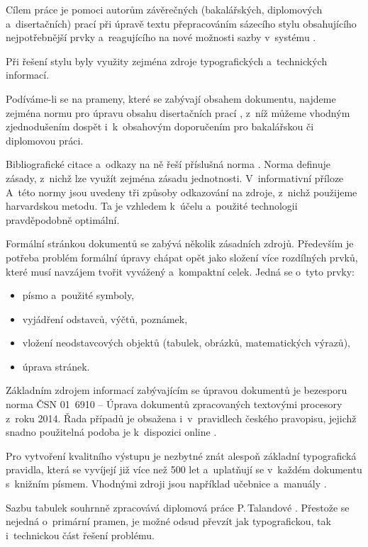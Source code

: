 \documentclass[twoside,12pt]{article}
\begin{document}
Cílem práce je pomoci autorům závěrečných (bakalářských, diplomových
a~disertačních) prací při úpravě textu přepracováním sázecího stylu obsahujícího
nejpotřebnější prvky a~reagujícího na nové možnosti sazby v~systému \XeLaTeX.

Při řešení stylu byly využity zejména zdroje typografických a~technických
informací.

Podíváme-li se na prameny, které se zabývají obsahem dokumentu, najdeme
zejména normu pro úpravu obsahu disertačních prací \cite{csn7144}, z~níž
můžeme vhodným zjednodušením dospět i~k~obsahovým doporučením pro bakalářskou
či diplomovou práci.

Bibliografické citace a~odkazy na ně řeší příslušná norma \cite{csniso690}.
Norma definuje zásady, z~nichž lze využít zejména zásadu jednotnosti. V~informativní
příloze A~této normy jsou uvedeny tři způsoby odkazování na zdroje, z~nichž
použijeme harvardskou metodu. Ta je vzhledem k~účelu a~použité technologii
pravděpodobně optimální.

Formální stránkou dokumentů se zabývá několik zásadních zdrojů. Především je potřeba
problém formální úpravy chápat opět jako složení více rozdílných prvků, které
musí navzájem tvořit vyvážený a~kompaktní celek. Jedná se o~tyto prvky:
\begin{itemize}
    \item písmo a~použité symboly,
    \item vyjádření odstavců, výčtů, poznámek,
    \item vložení neodstavcových objektů (tabulek, obrázků, matematických výrazů),
    \item úprava stránek.
\end{itemize}

Základním zdrojem informací zabývajícím se úpravou dokumentů je bezesporu
norma ČSN 01~6910 -- Úprava dokumentů zpracovaných textovými procesory z~roku
2014. Řada případů je obsažena i~v~pravidlech českého pravopisu, jejichž
snadno použitelná podoba je k~dispozici online \cite{pravidla}.

Pro vytvoření kvalitního výstupu je nezbytné znát alespoň základní typografická
pravidla, která se vyvíjejí již více než 500 let a~uplatňují se v~každém
dokumentu s~knižním písmem. Vhodnými zdroji jsou například učebnice a~manuály
\cite{pop, beran, latzac}.

Sazbu tabulek souhrnně zpracovává diplomová práce P.\,Talandové
\cite{TalDipl}. Přestože se nejedná o~primární pramen, je možné odsud převzít
jak typografickou, tak i~technickou část řešení problému.
\end{document}
